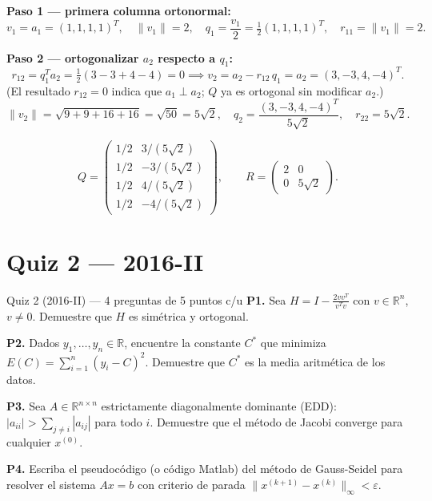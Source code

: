\documentclass[11pt,a4paper]{article}
\begin{document}
\textbf{Paso 1 --- primera columna ortonormal:}
\[
  v_1 = a_1 = (1,1,1,1)^T, \quad \|v_1\|=2, \quad
  q_1 = \frac{v_1}{2} = \tfrac{1}{2}(1,1,1,1)^T, \quad r_{11}=\|v_1\|=2.
\]

\textbf{Paso 2 --- ortogonalizar $a_2$ respecto a $q_1$:}
\[
  r_{12} = q_1^T a_2 = \tfrac{1}{2}(3-3+4-4) = 0
  \implies v_2 = a_2 - r_{12}\,q_1 = a_2 = (3,-3,4,-4)^T.
\]
(El resultado $r_{12}=0$ indica que $a_1\perp a_2$; $Q$ ya es ortogonal sin modificar $a_2$.)
\[
  \|v_2\| = \sqrt{9+9+16+16} = \sqrt{50} = 5\sqrt{2}, \quad
  q_2 = \frac{(3,-3,4,-4)^T}{5\sqrt{2}}, \quad r_{22}=5\sqrt{2}.
\]

\[
  Q = \begin{pmatrix}1/2 & 3/(5\sqrt{2}) \\ 1/2 & -3/(5\sqrt{2}) \\
  1/2 & 4/(5\sqrt{2}) \\ 1/2 & -4/(5\sqrt{2})\end{pmatrix}, \qquad
  R = \begin{pmatrix}2 & 0 \\ 0 & 5\sqrt{2}\end{pmatrix}.
\]

\section{Quiz 2 --- 2016-II}

\begin{examen}{Quiz 2 (2016-II) --- 4 preguntas de 5 puntos c/u}
\textbf{P1.} Sea $H=I-\frac{2vv^T}{v^Tv}$ con $v\in\mathbb{R}^n$, $v\ne0$. Demuestre que $H$ es simétrica y ortogonal.

\smallskip\textbf{P2.} Dados $y_1,\ldots,y_n\in\mathbb{R}$, encuentre la constante $C^*$ que minimiza $E(C)=\sum_{i=1}^n(y_i-C)^2$. Demuestre que $C^*$ es la media aritmética de los datos.

\smallskip\textbf{P3.} Sea $A\in\mathbb{R}^{n\times n}$ estrictamente diagonalmente dominante (EDD): $|a_{ii}|>\sum_{j\ne i}|a_{ij}|$ para todo $i$. Demuestre que el método de Jacobi converge para cualquier $x^{(0)}$.

\smallskip\textbf{P4.} Escriba el pseudocódigo (o código Matlab) del método de Gauss-Seidel para resolver el sistema $Ax=b$ con criterio de parada $\|x^{(k+1)}-x^{(k)}\|_\infty<\varepsilon$.
\end{examen}
\end{document}
